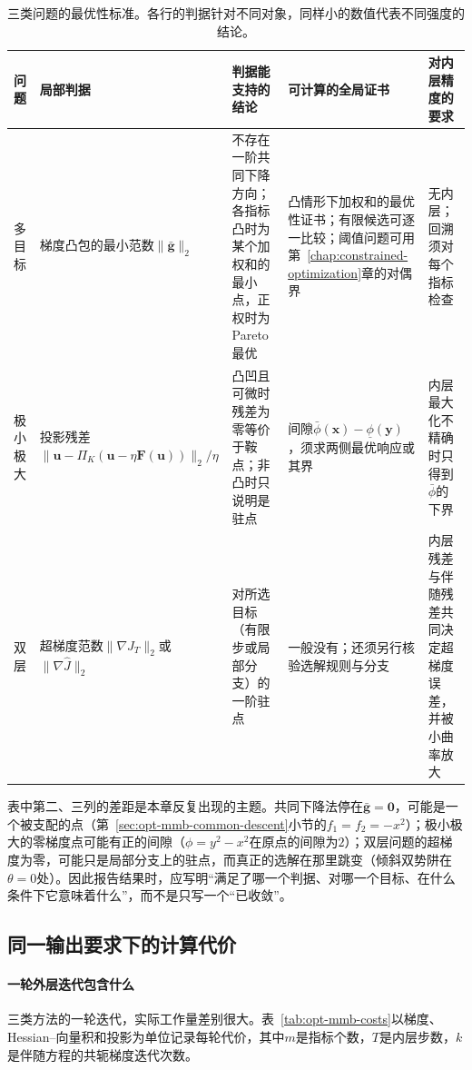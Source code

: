 \begin{table}[!htbp]
  \centering
  \small
  \begin{tabularx}{\linewidth}{@{}p{12mm}XXXX@{}}
    \toprule
    问题 & 局部判据 & 判据能支持的结论 & 可计算的全局证书 & 对内层精度的要求 \\
    \midrule
    多目标 & 梯度凸包的最小范数$\lVert\bar{\bm g}\rVert_2$ & 不存在一阶共同下降方向；各指标凸时为某个加权和的最小点，正权时为Pareto最优 & 凸情形下加权和的最优性证书；有限候选可逐一比较；阈值问题可用第~\ref{chap:constrained-optimization}章的对偶界 & 无内层；回溯须对每个指标检查 \\
    极小极大 & 投影残差$\lVert\bm u-\Pi_K(\bm u-\eta\bm F(\bm u))\rVert_2/\eta$ & 凸凹且可微时残差为零等价于鞍点；非凸时只说明是驻点 & 间隙$\bar\phi(\bm x)-\underline\phi(\bm y)$，须求两侧最优响应或其界 & 内层最大化不精确时只得到$\bar\phi$的下界 \\
    双层 & 超梯度范数$\lVert\nabla J_T\rVert_2$或$\lVert\nabla\widehat J\rVert_2$ & 对所选目标（有限步或局部分支）的一阶驻点 & 一般没有；还须另行核验选解规则与分支 & 内层残差与伴随残差共同决定超梯度误差，并被小曲率放大 \\
    \bottomrule
  \end{tabularx}
  \caption{三类问题的最优性标准。各行的判据针对不同对象，同样小的数值代表不同强度的结论。}
  \label{tab:opt-mmb-standards}
\end{table}

表中第二、三列的差距是本章反复出现的主题。共同下降法停在$\bar{\bm g}=\bm 0$，可能是一个被支配的点（第~\ref{sec:opt-mmb-common-descent}小节的$f_1=f_2=-x^2$）；极小极大的零梯度点可能有正的间隙（$\phi=y^2-x^2$在原点的间隙为$2$）；双层问题的超梯度为零，可能只是局部分支上的驻点，而真正的选解在那里跳变（倾斜双势阱在$\theta=0$处）。因此报告结果时，应写明“满足了哪一个判据、对哪一个目标、在什么条件下它意味着什么”，而不是只写一个“已收敛”。

\subsection{同一输出要求下的计算代价}
\label{sec:opt-mmb-costs}

\paragraph{一轮外层迭代包含什么}
三类方法的一轮迭代，实际工作量差别很大。表~\ref{tab:opt-mmb-costs}以梯度、Hessian--向量积和投影为单位记录每轮代价，其中$m$是指标个数，$T$是内层步数，$k$是伴随方程的共轭梯度迭代次数。


